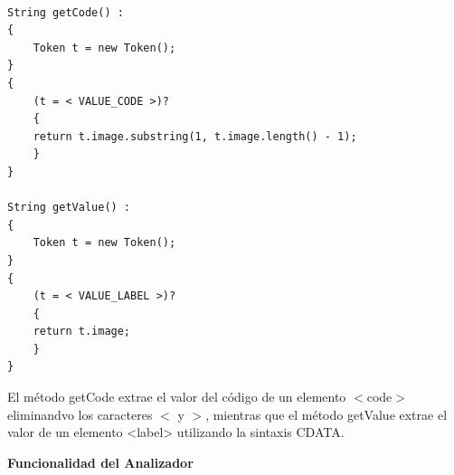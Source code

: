 \lstset{inputencoding=utf8/latin1}
\begin{lstlisting}

String getCode() :
{
    Token t = new Token();
}
{
    (t = < VALUE_CODE >)?
    {
    return t.image.substring(1, t.image.length() - 1);
    }
}

String getValue() :
{
    Token t = new Token();
}
{
    (t = < VALUE_LABEL >)?
    {
    return t.image;
    }
}  

\end{lstlisting}

El método getCode extrae el valor del código de un elemento $<$code$>$ eliminandvo los caracteres $<$ y $>$, mientras que el método getValue extrae el valor de un elemento <label> utilizando la sintaxis CDATA.

\phantom{text}

\noindent \textbf{Funcionalidad del Analizador}

\phantom{text}





